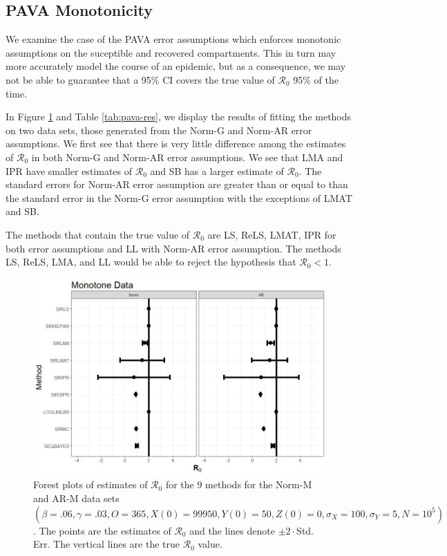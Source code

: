 \documentclass[12pt]{article}
\newcommand{\xxsir}{\ensuremath{9} } %
\newcommand{\rr}{\ensuremath{\mathcal{R}_0}}
\begin{document}
\subsection{PAVA Monotonicity}\label{sec:res-PAVA}
We examine the case of the PAVA error assumptions which enforces monotonic assumptions on the suceptible and recovered compartments.  This in turn may more accurately model the course of an epidemic, but as a consequence, we may not be able to guarantee that a 95\% CI covers the true value of $\rr$ 95\% of the time.

In Figure \ref{fig:pava-res} and Table \ref{tab:pava-res}, we display the results of fitting the methods on two data sets, those generated from the Norm-G and Norm-AR error assumptions.  We first see that there is very little difference among the estimates of $\rr$ in both Norm-G and Norm-AR error assumptions.  We see that LMA and IPR have smaller estimates of $\rr$ and SB has a larger estimate of $\rr$.  The standard errors for Norm-AR error assumption are greater than or equal to than the standard error in the Norm-G error assumption with the exceptions of LMAT and SB.

The methods that contain the true value of $\rr$ are LS, ReLS, LMAT, IPR for both error assumptions and LL with Norm-AR error assumption.  The methods LS, ReLS, LMA, and LL would be able to reject the hypothesis that $\rr < 1$.

\begin{figure}[H]
	\centering
	\includegraphics[scale=0.5]{images/mono.jpeg}
	\caption{Forest plots of estimates of $\rr$ for the \xxsir methods for the Norm-M and AR-M data sets $(\beta=.06, \gamma=.03, O=365, X(0)=99950, Y(0)=50, Z(0)=0, \sigma_X=100, \sigma_Y=5, N=10^5)$.  The points are the estimates of $\rr$ and the lines denote $\pm 2\cdot $Std. Err.  The vertical lines are the true $\rr$ value.}
	\label{fig:pava-res}
\end{figure}
\end{document}

